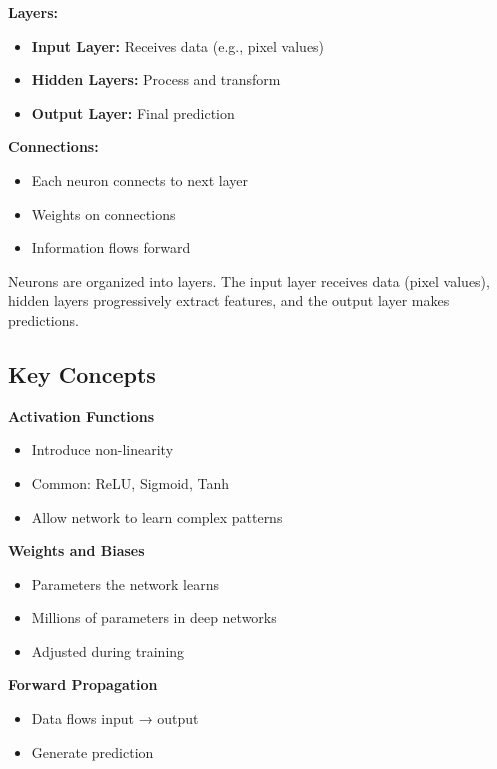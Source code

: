 \documentclass[
  letterpaper,
  DIV=11,
  numbers=noendperiod]{scrartcl}
\providecommand{\tightlist}{%
  \setlength{\itemsep}{0pt}\setlength{\parskip}{0pt}}
\begin{document}
\textbf{Layers:}

\begin{itemize}
\tightlist
\item
  \textbf{Input Layer:} Receives data (e.g., pixel values)
\item
  \textbf{Hidden Layers:} Process and transform
\item
  \textbf{Output Layer:} Final prediction
\end{itemize}

\textbf{Connections:}

\begin{itemize}
\tightlist
\item
  Each neuron connects to next layer
\item
  Weights on connections
\item
  Information flows forward
\end{itemize}

Neurons are organized into layers. The input layer receives data (pixel
values), hidden layers progressively extract features, and the output
layer makes predictions.

\subsection{Key Concepts}\label{key-concepts}

\textbf{Activation Functions}

\begin{itemize}
\tightlist
\item
  Introduce non-linearity
\item
  Common: ReLU, Sigmoid, Tanh
\item
  Allow network to learn complex patterns
\end{itemize}

\textbf{Weights and Biases}

\begin{itemize}
\tightlist
\item
  Parameters the network learns
\item
  Millions of parameters in deep networks
\item
  Adjusted during training
\end{itemize}

\textbf{Forward Propagation}

\begin{itemize}
\tightlist
\item
  Data flows input → output
\item
  Generate prediction
\end{itemize}
\end{document}

